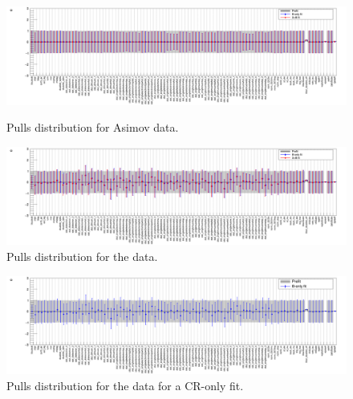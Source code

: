 \clearpage


\begin{figure}
\centering
\includegraphics[width=1.25\textwidth, angle =90]{figures/pullsImpact/pulls_asimov.png}\\
\caption{Pulls distribution for Asimov data.}
\label{pulls}
\end{figure}


\clearpage


\begin{figure}
\centering
\includegraphics[width=1.25\textwidth, angle =90]{figures/pullsImpact/pulls_data.png}
\caption{Pulls distribution for the data. }
\label{pulls-data}
\end{figure}

\clearpage


\begin{figure}
\centering
\includegraphics[width=1.25\textwidth, angle =90]{figures/pullsImpact/pulls_data_maskedsignal.png}
\caption{Pulls distribution for the data for a CR-only fit.}
\label{pulls-data-signal-masked}
\end{figure}


\clearpage


